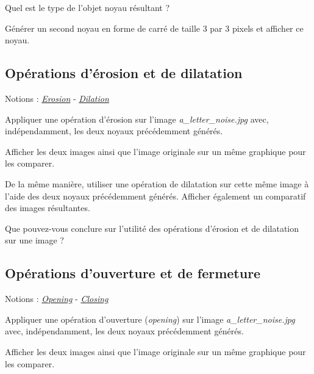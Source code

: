 \documentclass[a4paper,11pt,titlepage]{article} %
\begin{document}
\Quest Quel est le type de l'objet noyau résultant ?

\Manip Générer un second noyau en forme de carré de taille 3 par 3 pixels et afficher ce noyau.

\newpage
\subsection{Opérations d'érosion et de dilatation}

\begin{mdframed}[style=sidebar,frametitle={}]
Notions : \href{https://iogs-lense-training.github.io/image-processing/contents/opencv_erod_dila.html#erosion-operation}{\textit{Erosion}} - \href{https://iogs-lense-training.github.io/image-processing/contents/opencv_erod_dila.html#dilation-operation}{\textit{Dilation}} 
\end{mdframed}

\Manip Appliquer une opération d'érosion sur l'image \textsl{a\_letter\_noise.jpg} avec, indépendamment, les deux noyaux précédemment générés. 

\Manip Afficher les deux images ainsi que l'image originale sur un même graphique pour les comparer.

\Manip De la même manière, utiliser une opération de dilatation sur cette même image à l'aide des deux noyaux précédemment générés. Afficher également un comparatif des images résultantes.

\Quest Que pouvez-vous conclure sur l'utilité des opérations d'érosion et de dilatation sur une image ?

\subsection{Opérations d'ouverture et de fermeture}

\begin{mdframed}[style=sidebar,frametitle={}]
Notions : \href{https://iogs-lense-training.github.io/image-processing/contents/opencv_open_close.html#opening-operation}{\textit{Opening}} - \href{https://iogs-lense-training.github.io/image-processing/contents/opencv_open_close.html#closing-operation}{\textit{Closing}} 
\end{mdframed}

\Manip Appliquer une opération d'ouverture (\textit{opening}) sur l'image \textsl{a\_letter\_noise.jpg} avec, indépendamment, les deux noyaux précédemment générés. 

\Manip Afficher les deux images ainsi que l'image originale sur un même graphique pour les comparer.
\end{document}
